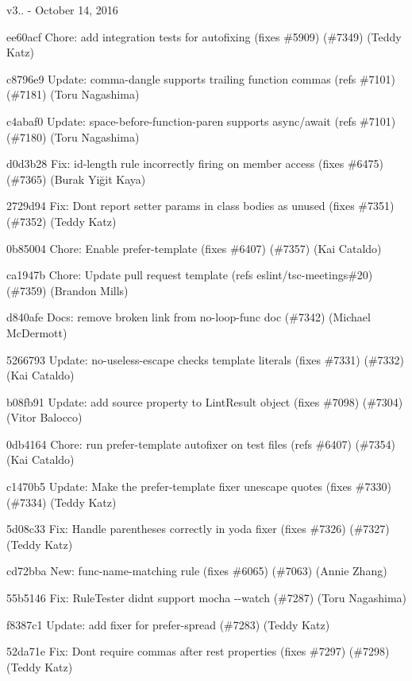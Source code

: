 v3.. -\/ October 14, 2016


\begin{DoxyItemize}
\item ee60acf Chore\+: add integration tests for autofixing (fixes \#5909) (\#7349) (Teddy Katz)
\item c8796e9 Update\+: {\ttfamily comma-\/dangle} supports trailing function commas (refs \#7101) (\#7181) (Toru Nagashima)
\item c4abaf0 Update\+: {\ttfamily space-\/before-\/function-\/paren} supports async/await (refs \#7101) (\#7180) (Toru Nagashima)
\item d0d3b28 Fix\+: id-\/length rule incorrectly firing on member access (fixes \#6475) (\#7365) (Burak Yiğit Kaya)
\item 2729d94 Fix\+: Don\textquotesingle{}t report setter params in class bodies as unused (fixes \#7351) (\#7352) (Teddy Katz)
\item 0b85004 Chore\+: Enable prefer-\/template (fixes \#6407) (\#7357) (Kai Cataldo)
\item ca1947b Chore\+: Update pull request template (refs eslint/tsc-\/meetings\#20) (\#7359) (Brandon Mills)
\item d840afe Docs\+: remove broken link from no-\/loop-\/func doc (\#7342) (Michael Mc\+Dermott)
\item 5266793 Update\+: no-\/useless-\/escape checks template literals (fixes \#7331) (\#7332) (Kai Cataldo)
\item b08fb91 Update\+: add source property to Lint\+Result object (fixes \#7098) (\#7304) (Vitor Balocco)
\item 0db4164 Chore\+: run prefer-\/template autofixer on test files (refs \#6407) (\#7354) (Kai Cataldo)
\item c1470b5 Update\+: Make the {\ttfamily prefer-\/template} fixer unescape quotes (fixes \#7330) (\#7334) (Teddy Katz)
\item 5d08c33 Fix\+: Handle parentheses correctly in {\ttfamily yoda} fixer (fixes \#7326) (\#7327) (Teddy Katz)
\item cd72bba New\+: {\ttfamily func-\/name-\/matching} rule (fixes \#6065) (\#7063) (Annie Zhang)
\item 55b5146 Fix\+: {\ttfamily Rule\+Tester} didn\textquotesingle{}t support {\ttfamily mocha -\/-\/watch} (\#7287) (Toru Nagashima)
\item f8387c1 Update\+: add fixer for {\ttfamily prefer-\/spread} (\#7283) (Teddy Katz)
\item 52da71e Fix\+: Don\textquotesingle{}t require commas after rest properties (fixes \#7297) (\#7298) (Teddy Katz)

\end{DoxyItemize}
